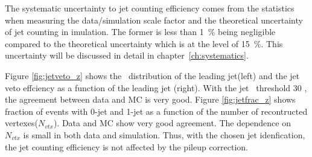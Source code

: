 The systematic uncertainty to jet counting efficiency comes from the statistics 
when measuring the data/simulation scale factor and the theoretical uncertainty of jet 
counting in imulation. The former is less than 1~\% being negligible 
compared to the theoretical uncertainty which is at the level of 15~\%. 
This uncertainty will be discussed in detail in chapter~\ref{ch:systematics}. 

Figure \ref{fig:jetveto_z} shows the \pt~distribution of the leading jet(left) 
and the jet veto effciency as a function of the leading jet \pt(right).
With the jet \pt~threshold 30 \GeV, the agreement between data and MC is very good. 
Figure \ref{fig:jetfrac_z} shows fraction of events with 0-jet and 
1-jet as a function of the number of recontructed vertexes($N_{vtx}$). 
Data and MC show very good agreement.
The dependence on $N_{vtx}$ is small in both data and simulation.
Thus, with the chosen jet idenfication, the jet counting efficiency 
is not affected by the pileup correction. 

